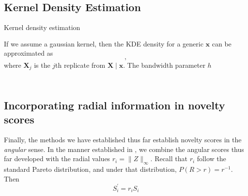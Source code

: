 \subsection{Kernel Density Estimation}

Kernel density estimation

If we assume a gaussian kernel, then the KDE density for a generic $\bm{x}$ can 
  be approximated as
  \begin{equation*}
    ,
  \end{equation*}
  where $\bm{X}_j$ is the $j$th replicate from $\bm{X}\mid\bm{x}$.  The bandwidth
  parameter $h$ 

\begin{equation*}
  
\end{equation*}

\begin{equation*}
  
\end{equation*}

\subsection{Incorporating radial information in novelty scores}
Finally, the methods we have established thus far establish novelty scores in 
  the \emph{angular} sense.  In the manner established in \cite{goix2017}, we 
  combine the angular scores thus far developed with the radial values 
  $r_i = \lVert Z \rVert_{\infty}$.  Recall that $r_i$ follow the standard 
  Pareto distribution, and under that distribution, $P(R > r) = r^{-1}$.  Then
  \[
    S_i^{\prime} = r_iS_i
  \]

